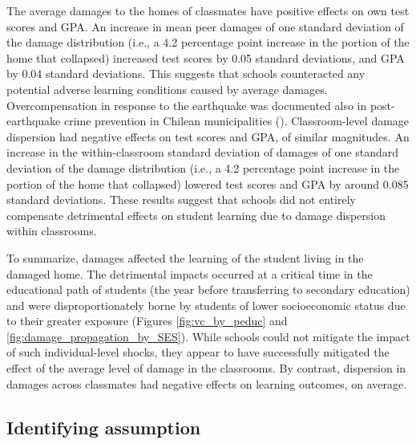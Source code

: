 The average damages to the homes of classmates have positive effects on own test scores and GPA. An increase in mean peer damages of one standard deviation of the damage distribution (i.e., a 4.2 percentage point increase in the portion of the home that collapsed) increased test scores by 0.05 standard deviations, and GPA by 0.04 standard deviations. This suggests that schools counteracted any potential adverse learning conditions caused by average damages. Overcompensation in response to the earthquake was documented also in post-earthquake crime prevention in Chilean municipalities (\cite{hombrados2020lasting}). Classroom-level damage dispersion had negative effects on test scores and GPA, of similar magnitudes. An increase in the within-classroom standard deviation of damages of one standard deviation of the damage distribution (i.e., a 4.2 percentage point increase in the portion of the home that collapsed) lowered test scores and GPA by around 0.085 standard deviations. These results suggest that schools did not entirely compensate detrimental effects on student learning due to damage dispersion within classrooms. \par 


To summarize, damages affected the learning of the student living in the damaged home. The detrimental impacts occurred at a critical time in the educational path of students (the year before transferring to secondary education) and were disproportionately borne by students of lower socioeconomic status due to their greater exposure (Figures \ref{fig:vc_by_peduc} and \ref{fig:damage_propagation_by_SES}). While schools could not mitigate the impact of such individual-level shocks, they appear to have successfully mitigated the effect of the average level of damage in the classrooms. By contrast, dispersion in damages across classmates had negative effects on learning outcomes, on average.\par 


\subsection{Identifying assumption}\label{sec:testing}


